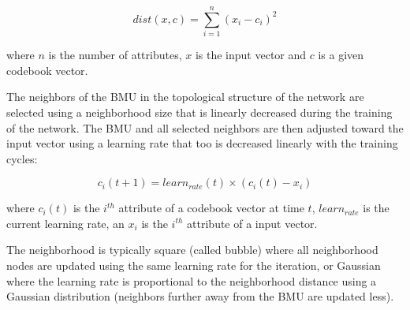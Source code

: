 \begin{equation}
	dist(x,c) = \sum_{i=1}^{n} (x_i - c_i)^2
\end{equation}

where $n$ is the number of attributes, $x$ is the input vector and $c$ is a given codebook vector.

The neighbors of the BMU in the topological structure of the network are selected using a neighborhood size that is linearly decreased during the training of the network. The BMU and all selected neighbors are then adjusted toward the input vector using a learning rate that too is decreased linearly with the training cycles:

\begin{equation}
	c_i(t+1) = learn_{rate}(t) \times (c_i(t) - x_i)
\end{equation}

where $c_i(t)$ is the $i^{th}$ attribute of a codebook vector at time $t$, $learn_{rate}$ is the current learning rate, an $x_i$ is the $i^{th}$ attribute of a input vector.

The neighborhood is typically square (called bubble) where all neighborhood nodes are updated using the same learning rate for the iteration, or Gaussian where the learning rate is proportional to the neighborhood distance using a Gaussian distribution (neighbors further away from the BMU are updated less). 

